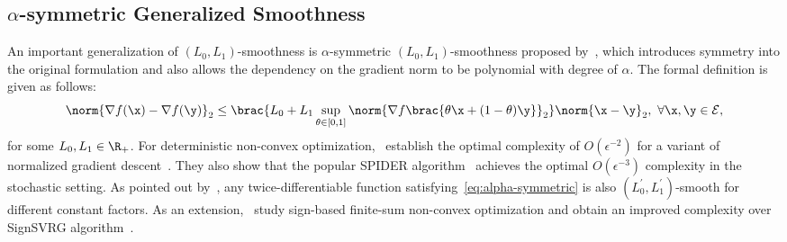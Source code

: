 \subsection{$\alpha$-symmetric Generalized Smoothness}
An important generalization of $(L_0,L_1)$-smoothness is $\alpha$-symmetric $(L_0,L_1)$-smoothness proposed by~\citet{chen2023generalized}, which introduces symmetry into the original formulation and also allows the dependency on the gradient norm to be polynomial with degree of $\alpha$. The formal definition is given as follows:
\begin{equation}
    \norm{\nabla f(\x)-\nabla f(\y)}_2\le\brac{L_0+L_1\sup_{\theta\in[0,1]}\norm{\nabla f\brac{\theta\x+(1-\theta)\y}}_2}\norm{\x-\y}_2,\ \forall\x,\y\in\mathcal{E},\label{eq:alpha-symmetric}
\end{equation}
for some $L_0,L_1\in\R_+$. For deterministic non-convex optimization,~\citet{chen2023generalized} establish the optimal complexity of $O(\epsilon^{-2})$ for a variant of normalized gradient descent~\citep{nesterov1984minimization,cortes2006finite}. They also show that the popular SPIDER algorithm~\citep{fang2018spider} achieves the optimal $O(\epsilon^{-3})$ complexity in the stochastic setting. As pointed out by~\citet{chen2023generalized,vankov2024optimizing}, any twice-differentiable function satisfying~\eqref{eq:alpha-symmetric} is also $(L_0^{'},L_1^{'})$-smooth for different constant factors. As an extension,~\citet{NeurIPS:2024:Jiang} study sign-based finite-sum non-convex optimization and obtain an improved complexity over SignSVRG algorithm~\citep{chzhen2023signsvrg}.

